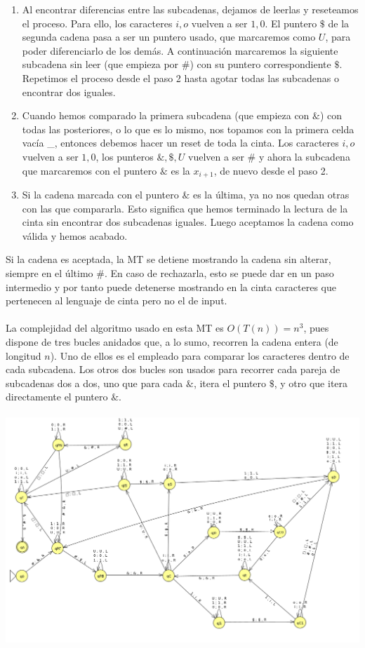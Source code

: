 \documentclass[11pt, a4paper]{exam}
\begin{document}
\begin{questions}
\begin{parts}
\begin{solution}
\begin{enumerate}
                \item Al encontrar diferencias entre las subcadenas, dejamos de leerlas y reseteamos el proceso. Para ello, los caracteres $i,o$ vuelven a ser $1,0$. El puntero $\$$ de la segunda cadena pasa a ser un puntero usado, que marcaremos como $U$, para poder diferenciarlo de los demás. A continuación marcaremos la siguiente subcadena sin leer (que empieza por $\#$) con su puntero correspondiente $\$$. Repetimos el proceso desde el paso 2 hasta agotar todas las subcadenas o encontrar dos iguales.
                \item Cuando hemos comparado la primera subcadena (que empieza con $\&$) con todas las posteriores, o lo que es lo mismo, nos topamos con la primera celda vacía \_, entonces debemos hacer un reset de toda la cinta. Los caracteres $i,o$ vuelven a ser $1,0$, los punteros $\&,\$,U$ vuelven a ser $\#$ y ahora la subcadena que marcaremos con el puntero $\&$ es la $x_{i+1}$, de nuevo desde el paso 2.
                \item Si la cadena marcada con el puntero $\&$ es la última, ya no nos quedan otras con las que compararla. Esto significa que hemos terminado la lectura de la cinta sin encontrar dos subcadenas iguales. Luego aceptamos la cadena como válida y hemos acabado.
            \end{enumerate}
            Si la cadena es aceptada, la MT se detiene mostrando la cadena sin alterar, siempre en el último $\#$. En caso de rechazarla, esto se puede dar en un paso intermedio y por tanto puede detenerse mostrando en la cinta caracteres que pertenecen al lenguaje de cinta pero no el de input.
            \\
            \\
            La complejidad del algoritmo usado en esta MT es $O(T(n)) = n^3$, pues dispone de tres bucles anidados que, a lo sumo, recorren la cadena entera (de longitud $n$). Uno de ellos es el empleado para comparar los caracteres dentro de cada subcadena. Los otros dos bucles son usados para recorrer cada pareja de subcadenas dos a dos, uno que para cada $\&$, itera el puntero $\$$, y otro que itera directamente el puntero $\&$.
            \\
            \\
            \includegraphics[width = 15 cm]{figs/M4Unicinta.png}

\end{solution}
\end{parts}
\end{questions}
\end{document}
